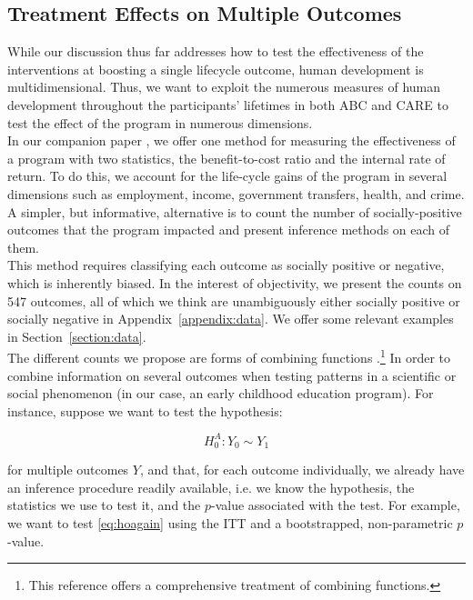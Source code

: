 \subsection{Treatment Effects on Multiple Outcomes}

\noindent While our discussion thus far addresses how to test the effectiveness of the interventions at boosting a single lifecycle outcome, human development is multidimensional. Thus, we want to exploit the numerous measures of human development throughout the participants' lifetimes in both ABC and CARE to test the effect of the program in numerous dimensions. \\

\noindent In our companion paper \citep{Elango_et_al_2015_ABC_unpublished}, we offer one method for measuring the effectiveness of a program with two statistics, the benefit-to-cost ratio and the internal rate of return. To do this, we account for the life-cycle gains of the program in several dimensions such as employment, income, government transfers, health, and crime. A simpler, but informative, alternative is to count the number of socially-positive outcomes that the program  impacted and present inference methods on each of them.\\

\noindent This method requires classifying each outcome as socially positive or negative, which is inherently biased. In the interest of objectivity, we present the counts on 547 outcomes, all of which we think are unambiguously either socially positive or socially negative in Appendix~\ref{appendix:data}. We offer some relevant examples in Section~\ref{section:data}.\\

\noindent The different counts we propose are forms of combining functions \citep{Pesarin_Salmaso_2010_PermutationTests}.\footnote{This reference offers a comprehensive treatment of combining functions.} In order to combine information on several outcomes when testing patterns in a scientific or social phenomenon (in our case, an early childhood education program). For instance, suppose we want to test the hypothesis: 

\begin{equation}
H_{0}^A: Y_{0} \sim Y_{1} \label{eq:hoagain}
\end{equation}

\noindent for multiple outcomes $Y$, and that, for each outcome individually, we already have an inference procedure readily available, i.e. we know the hypothesis, the statistics we use to test it, and the $p$-value associated with the test. For example, we want to test \eqref{eq:hoagain} using the ITT and a bootstrapped, non-parametric $p$-value.\\

